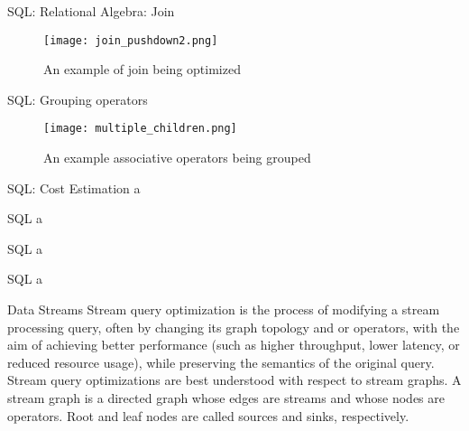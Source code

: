 \begin{frame}{SQL: Relational Algebra: Join}
    \begin{figure}
        \centering
        \texttt{[image: join\_pushdown2.png]}\\
        \caption{An example of join being optimized}
        \label{fig:j_2}
    \end{figure}
\end{frame}

\begin{frame}{SQL: Grouping operators}
    \begin{figure}
        \centering
        \texttt{[image: multiple\_children.png]}\\
        \caption{An example associative operators being grouped}
        \label{fig:j_2}
    \end{figure}
\end{frame}

\begin{frame}{SQL: Cost Estimation}
    a
\end{frame}

\begin{frame}{SQL}
    a
\end{frame}

\begin{frame}{SQL}
    a
\end{frame}

\begin{frame}{SQL}
    a
\end{frame}


\begin{frame}{Data Streams}
    Stream query optimization is the process of modifying a stream processing query, often by changing  its  graph  topology  and or  operators,  with the  aim  of  achieving  better  performance  (such as  higher  throughput,  lower  latency,  or  reduced resource usage), while preserving the semantics of the original query.\\
    Stream  query  optimizations  are  best  understood  with  respect  to  stream  graphs.  A stream graph is a directed graph whose edges are streams and  whose  nodes  are  operators.  Root  and  leaf nodes are called sources and sinks, respectively.
\end{frame}

